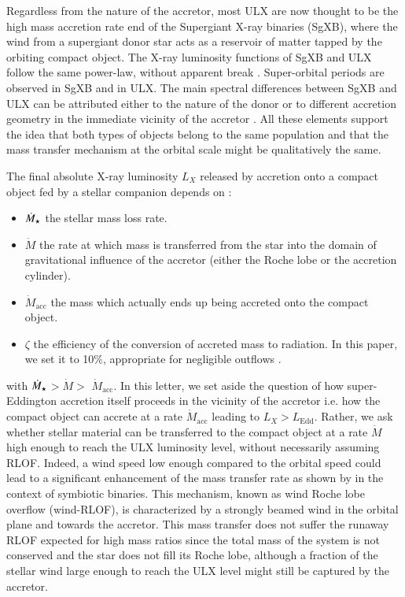 \documentclass[letter]{aa}
\makeatletter
\newcommand{\sgx}{SgXB\xspace}
\newcommand{\ulx}{ULX\xspace}
\newcommand*{\rlof}{RLOF\@\xspace}
\newcommand*{\ie}{i.e.\@\xspace}
\newcommand{\mystar}{{\fontfamily{lmr}\selectfont$\star$}}
\newcommand*{\mdotstar}{$\dot{M}_{\text{\mystar}}$\@\xspace}
\newcommand*{\mdotacc}{$\dot{M}_{\text{acc}}$\@\xspace}
\newcommand*{\ledd}{$L_{\text{Edd}}$\@\xspace}
\makeatother
\begin{document}
Regardless from the nature of the accretor, most ULX are now thought to be the high mass accretion rate end of the Supergiant X-ray binaries (\sgx), where the wind from a supergiant donor star acts as a reservoir of matter tapped by the orbiting compact object. The X-ray luminosity functions of \sgx and \ulx follow the same power-law, without apparent break \citep{Gilfanov2004,Swartz2011}. Super-orbital periods are observed in \sgx \citep{Corbet2013} and in \ulx \citep{Walton2016,Fuerst2018}. The main spectral differences between \sgx and \ulx can be attributed either to the nature of the donor or to different accretion geometry in the immediate vicinity of the accretor \citep{Kaaret2017}. All these elements support the idea that both types of objects belong to the same population and that the mass transfer mechanism at the orbital scale might be qualitatively the same.

The final absolute X-ray luminosity $L_X$ released by accretion onto a compact object fed by a stellar companion depends on :
\begin{itemize}
\item \mdotstar the stellar mass loss rate.
\item $\dot{M}$ the rate at which mass is transferred from the star into the domain of gravitational influence of the accretor (either the Roche lobe or the accretion cylinder).
\item \mdotacc the mass which actually ends up being accreted onto the compact object.
\item $\zeta$ the efficiency of the conversion of accreted mass to radiation. In this paper, we set it to 10$\%$, appropriate for negligible outflows \citep{Kaaret2017}.
\end{itemize} 
with \mdotstar$>\dot{M}>$ \mdotacc. In this letter, we set aside the question of how super-Eddington accretion itself proceeds in the vicinity of the accretor \ie how the compact object can accrete at a rate \mdotacc leading to $L_X>$\ledd. Rather, we ask whether stellar material can be transferred to the compact object at a rate $\dot{M}$ high enough to reach the ULX luminosity level, without necessarily assuming \rlof. Indeed, a wind speed low enough compared to the orbital speed could lead to a significant enhancement of the mass transfer rate as shown by \cite{Mohamed2007} in the context of symbiotic binaries. This mechanism, known as wind Roche lobe overflow (wind-\rlof), is characterized by a strongly beamed wind in the orbital plane and towards the accretor. This mass transfer does not suffer the runaway \rlof expected for high mass ratios since the total mass of the system is not conserved and the star does not fill its Roche lobe, although a fraction of the stellar wind large enough to reach the \ulx level might still be captured by the accretor.
\end{document}
